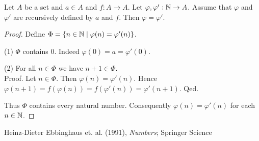 \documentclass{article}
\begin{document}
  \begin{forthel}
    \begin{theorem*}\label{dedekind_uniqueness}
      Let $A$ be a set and $a \in A$ and $f : A \to A$.
      Let $\varphi, \varphi' : \mathbb{N} \to A$.
      Assume that $\varphi$ and $\varphi'$ are recursively defined by $a$ and
      $f$.
      Then $\varphi = \varphi'$.
    \end{theorem*}
    \begin{proof}
      Define $\Phi = \{ n \in \mathbb{N} \mid \varphi(n) = \varphi'(n) \}$.

      (1) $\Phi$ contains $0$.
      Indeed $\varphi(0) = a = \varphi'(0)$.

      (2) For all $n \in \Phi$ we have $n + 1 \in \Phi$. \\
      Proof.
        Let $n \in \Phi$.
        Then $\varphi(n) = \varphi'(n)$.
        Hence $\varphi(n + 1)
          = f(\varphi(n))
          = f(\varphi'(n))
          = \varphi'(n + 1)$.
      Qed.

      Thus $\Phi$ contains every natural number.
      Consequently $\varphi(n) = \varphi'(n)$ for each $n \in \mathbb{N}$.
    \end{proof}
  \end{forthel}

  \begin{thebibliography}{1}
     Heinz-Dieter Ebbinghaus et. al. (1991),
      \textit{Numbers};
      Springer Science
  \end{thebibliography}
\end{document}
